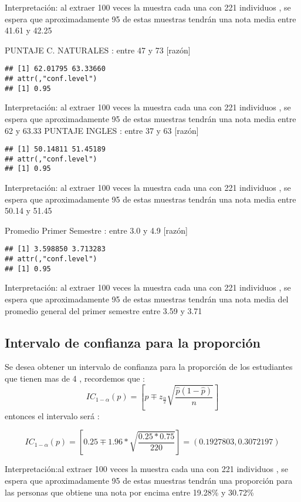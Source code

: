 \documentclass[
  man]{apa6}
\begin{document}
Interpretación: al extraer 100 veces la muestra cada una con 221
individuos , se espera que aproximadamente 95 de estas muestras tendrán
una nota media entre 41.61 y 42.25

PUNTAJE C. NATURALES : entre 47 y 73 {[}razón{]}

\begin{verbatim}
## [1] 62.01795 63.33660
## attr(,"conf.level")
## [1] 0.95
\end{verbatim}

Interpretación: al extraer 100 veces la muestra cada una con 221
individuos , se espera que aproximadamente 95 de estas muestras tendrán
una nota media entre 62 y 63.33
\newpage
PUNTAJE INGLES : entre 37 y 63 {[}razón{]}

\begin{verbatim}
## [1] 50.14811 51.45189
## attr(,"conf.level")
## [1] 0.95
\end{verbatim}

Interpretación: al extraer 100 veces la muestra cada una con 221
individuos , se espera que aproximadamente 95 de estas muestras tendrán
una nota media entre 50.14 y 51.45

Promedio Primer Semestre : entre 3.0 y 4.9 {[}razón{]}

\begin{verbatim}
## [1] 3.598850 3.713283
## attr(,"conf.level")
## [1] 0.95
\end{verbatim}

Interpretación: al extraer 100 veces la muestra cada una con 221
individuos , se espera que aproximadamente 95 de estas muestras tendrán
una nota media del promedio general del primer semestre entre 3.59 y
3.71
\newpage

\hypertarget{intervalo-de-confianza-para-la-proporciuxf3n}{%
\subsection{Intervalo de confianza para la proporción}\label{intervalo-de-confianza-para-la-proporciuxf3n}}

Se desea obtener un intervalo de confianza para la proporción de los estudiantes que
tienen mas de 4 , recordemos que :
\[
IC_{1-\alpha}(p)=[\hat p \mp z_{\frac{\alpha}{2}}\sqrt{\frac{\hat p (1-\hat p)}{n}}]
\]
entonces el intervalo será :

\[
IC_{1-\alpha}(p)=[0.25\mp 1.96 *\sqrt{\frac{0.25*0.75}{220}}]=(0.1927803,0.3072197)
\]

Interpretación:al extraer 100 veces la muestra cada una con 221
individuos , se espera que aproximadamente 95 de estas muestras tendrán
una proporción para las personas que obtiene una nota por encima entre 19.28\% y
30.72\%
\end{document}
